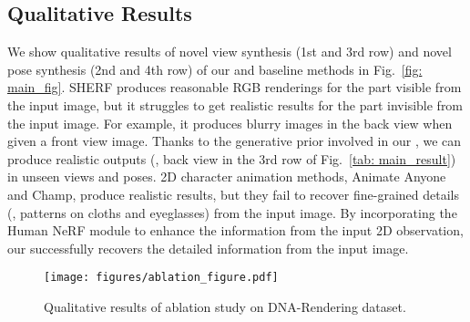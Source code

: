 \subsection{Qualitative Results}
We show qualitative results of novel view synthesis (1st and 3rd row) and novel pose synthesis (2nd and 4th row) of our \nickname{} and baseline methods in Fig.~\ref{fig: main_fig}. 
SHERF produces reasonable RGB renderings for the part visible from the input image, but it struggles to get realistic results for the part invisible from the input image.
For example, it produces blurry images in the back view when given a front view image.
Thanks to the generative prior involved in our \nickname{}, we can produce realistic outputs (\eg, back view in the 3rd row of Fig.~\ref{tab: main_result}) in unseen views and poses.
2D character animation methods, Animate Anyone and Champ, produce realistic results, but they fail to recover fine-grained details (\eg, patterns on cloths and eyeglasses) from the input image.
By incorporating the Human NeRF module to enhance the information from the input 2D observation, our \nickname{} successfully recovers the detailed information from the input image.

\begin{figure}[t]
    \centering
    \texttt{[image: figures/ablation\_figure.pdf]}
    \setlength{\abovecaptionskip}{0cm}
    \caption{Qualitative results of ablation study on DNA-Rendering dataset.} 
    \label{fig:ablation_fig}
\vspace{-4mm}
\end{figure}

